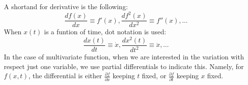 A shortand for derivative is the following:
\[\frac{df(x)}{dx}\equiv f'(x), \frac{df^2(x)}{dx^2}\equiv f''(x),\ldots\]
When $x(t)$ is a funtion of time, dot notation is used:
\[\frac{dx(t)}{dt}\equiv \dot{x}, \frac{dx^2(t)}{dt^2}\equiv \ddot{x},\ldots\]
In the case of multivariate function, when we are interested in the variation with respect just one variable, we use partial differentials to indicate this. Namely, for $f(x, t)$, the differential is either $\frac{\partial f}{\partial x}$ keeping $t$ fixed, or $\frac{\partial f}{\partial t}$ keeping $x$ fixed.